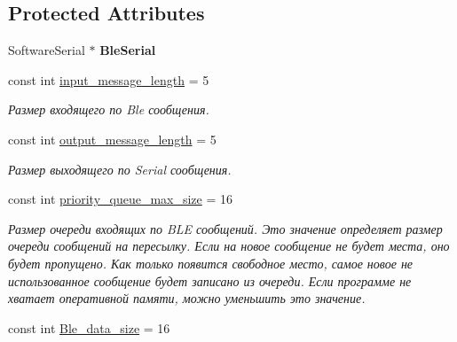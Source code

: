 \subsection*{Protected Attributes}
\begin{DoxyCompactItemize}
\item 
\mbox{\label{classBleConverter_acf02518f93d5ece7784338e285a5d857}} 
Software\+Serial $\ast$ {\bfseries Ble\+Serial}
\item 
\mbox{\label{classBleConverter_adc02237a5cd942227b74bdb8f140b148}} 
const int \hyperlink{classBleConverter_adc02237a5cd942227b74bdb8f140b148}{input\+\_\+message\+\_\+length} = 5
\begin{DoxyCompactList}\small\item\em Размер входящего по Ble сообщения. \end{DoxyCompactList}\item 
\mbox{\label{classBleConverter_af39c173eb10e2bcf24786cd5a11672db}} 
const int \hyperlink{classBleConverter_af39c173eb10e2bcf24786cd5a11672db}{output\+\_\+message\+\_\+length} = 5
\begin{DoxyCompactList}\small\item\em Размер выходящего по Serial сообщения. \end{DoxyCompactList}\item 
\mbox{\label{classBleConverter_aa2e5768adfddbecd88be6f7ee5836ea2}} 
const int \hyperlink{classBleConverter_aa2e5768adfddbecd88be6f7ee5836ea2}{priority\+\_\+queue\+\_\+max\+\_\+size} = 16
\begin{DoxyCompactList}\small\item\em Размер очереди входящих по B\+LE сообщений.  Это значение определяет размер очереди сообщений на пересылку. Если на новое сообщение не будет места, оно будет пропущено. Как только появится свободное место, самое новое не использованное сообщение будет записано из очереди. Если программе не хватает оперативной памяти, можно уменьшить это значение. \end{DoxyCompactList}\item 
\mbox{\label{classBleConverter_a4f0a23dfe1c6a258e9b08d92eae7f7f3}} 
const int \hyperlink{classBleConverter_a4f0a23dfe1c6a258e9b08d92eae7f7f3}{Ble\+\_\+data\+\_\+size} = 16

\end{DoxyCompactItemize}

